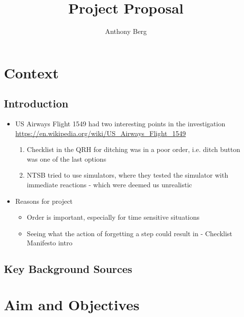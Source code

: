 \documentclass[a4paper]{article}
\author{Anthony Berg}
\title{Project Proposal}
\begin{document}
\begin{titlepage}
    \clearpage\maketitle
    \thispagestyle{empty}
    \clearpage\tableofcontents
    \thispagestyle{empty}
\end{titlepage}

\section{Context}
\subsection{Introduction}
\begin{itemize}
    \item US Airways Flight 1549 had two interesting points in the investigation
        \url{https://en.wikipedia.org/wiki/US_Airways_Flight_1549}
        \begin{enumerate}
            \item Checklist in the QRH for ditching was in a poor order,
                i.e. ditch button was one of the last options
            \item NTSB tried to use simulators, where they tested
                the simulator with immediate reactions - which were
                deemed us unrealistic
        \end{enumerate}
    \item Reasons for project
        \begin{itemize}
            \item Order is important, especially for time sensitive
                situations
            \item Seeing what the action of forgetting a step could
                result in - Checklist Manifesto intro
        \end{itemize}
\end{itemize}

\subsection{Key Background Sources}


\section{Aim and Objectives}
\end{document}
